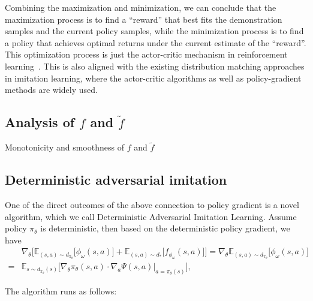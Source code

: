 Combining the maximization and minimization, 
we can conclude that the maximization process is to find a ``reward'' that best fits the demonstration samples and the current policy samples, 
while the minimization process is to find a policy that achieves optimal returns under the current estimate of the ``reward''. 
This optimization process is just the actor-critic mechanism in reinforcement learning~\citep{konda2000actor}. 
This is also aligned with the existing distribution matching approaches in imitation learning, where the actor-critic algorithms as well as policy-gradient methods are widely used.

\subsection{Analysis of $f$ and $\tilde{f}$}
Monotonicity and smoothness of $f$ and $\tilde{f}$


\subsection{Deterministic adversarial imitation}
One of the direct outcomes of the above connection to policy gradient is a novel algorithm, which we call Deterministic Adversarial Imitation Learning. 
Assume policy $\pi_{\theta}$ is deterministic, then based on the deterministic policy gradient, we have
\begin{align*}
& \nabla_{\theta} \Big[ \mathbb{E}_{(s, a)\sim d_{\pi_{\theta}}} \big[ \phi_{\omega}(s, a) \big] + \mathbb{E}_{(s, a)\sim d_*} \big[ f_{\phi_{\omega}}(s, a) \big] \Big] 
= \nabla_{\theta} \mathbb{E}_{(s, a)\sim d_{\pi_{\theta}}} \big[ \phi_{\omega}(s, a) \big] \\ 
= & \mathbb{E}_{s\sim d_{\pi_{\theta}}(s)} \big[  \nabla_\theta \pi_{\theta}(s, a) \cdot \nabla_a \Psi(s, a)\big|_{a=\pi_{\theta}(s)}\big], 
\end{align*}

The algorithm runs as follows:

